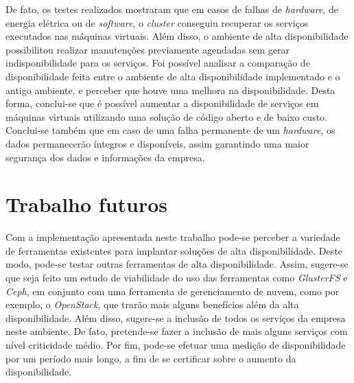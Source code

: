 De fato, os testes realizados mostraram que em casos de falhas de \textit{hardware}, de energia elétrica ou de \textit{software}, 
o \textit{cluster} conseguiu recuperar os serviços executados nas máquinas virtuais. Além disso, o ambiente de alta disponibilidade possibilitou
realizar manutenções previamente agendadas sem gerar indisponibilidade para os serviços.
Foi possível analisar a comparação de disponibilidade feita entre o ambiente de alta disponibilidade implementado e o antigo ambiente,
e perceber que houve uma melhora na disponibilidade. 
Desta forma, conclui-se que é possível aumentar a disponibilidade de serviços em máquinas virtuais utilizando uma solução 
de código aberto e de baixo custo.
Conclui-se também que em caso de uma falha permanente de um \textit{hardware}, os dados permanecerão íntegros e disponíveis, assim garantindo 
uma maior segurança dos dados e informações da empresa.


\section{Trabalho futuros}
\label{section:trabalhosfuturos}

Com a implementação apresentada neste trabalho pode-se perceber a variedade de ferramentas existentes para implantar soluções de alta 
disponibilidade. Deste modo, pode-se testar outras ferramentas de alta disponibilidade. Assim, sugere-se que seja feito um estudo de
viabilidade do uso das ferramentas como \textit{GlusterFS} e \textit{Ceph}, em conjunto com uma ferramenta de gerenciamento de nuvem, como
por exemplo, o \textit{OpenStack}, que trarão mais alguns benefícios além da alta disponibilidade.
Além disso, sugere-se a inclusão de todos os serviços da empresa neste ambiente. De fato, pretende-se fazer a inclusão de mais alguns
serviços com nível criticidade médio.
Por fim, pode-se efetuar uma medição de disponibilidade por um período mais longo, a fim de se certificar sobre o aumento da
disponibilidade.

